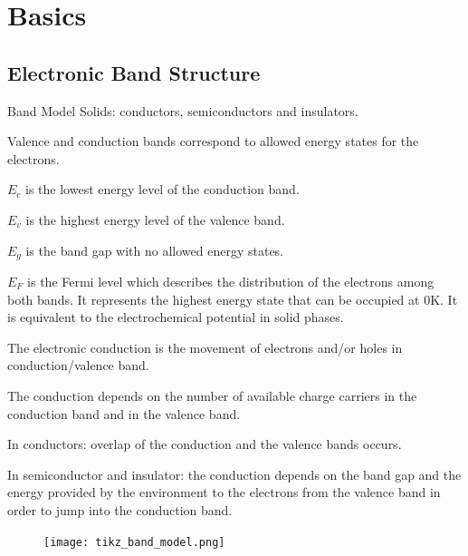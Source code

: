 \documentclass[10pt,compress,handout]{beamer}
\begin{document}
\section{Basics}
\subsection{Electronic Band Structure}
    \begin{frame}[allowframebreaks=1.0]{Band Model}
        Solids: conductors, semiconductors and insulators. 
        
        Valence and conduction bands correspond to allowed energy states for the electrons. 
        
        $E_c$ is the lowest energy level of the conduction band.
        
        $E_v$ is the highest energy level of the valence band.
        
        $E_g$ is the band gap with no allowed energy states. 
        
        $E_F$ is the Fermi level which describes the distribution of the electrons among both bands.
        It represents the highest energy state that can be occupied at 0K. 
        It is equivalent to the electrochemical potential in solid phases.
        
        \framebreak
        The electronic conduction is the movement of electrons and/or holes in conduction/valence band.

        The conduction depends on the number of available charge carriers
        in the conduction band and in the valence band. 
        
        In conductors: overlap of the conduction and the valence bands occurs. 
        
        In semiconductor and insulator: the conduction depends on the band gap and the energy provided by 
        the environment to the electrons from the valence band in order to jump 
        into the conduction band.

        \begin{figure}[h]
            \centering
                \texttt{[image: tikz\_band\_model.png]}
            \label{fig_band_model}
        \end{figure}
    \end{frame}
\end{document}
